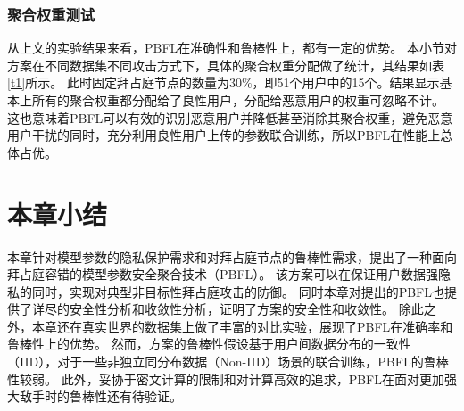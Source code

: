 \subsubsection{聚合权重测试}
从上文的实验结果来看，PBFL在准确性和鲁棒性上，都有一定的优势。
本小节对方案在不同数据集不同攻击方式下，具体的聚合权重分配做了统计，其结果如表\ref{t1}所示。
此时固定拜占庭节点的数量为$30\%$，即51个用户中的15个。结果显示基本上所有的聚合权重都分配给了良性用户，分配给恶意用户的权重可忽略不计。
这也意味着PBFL可以有效的识别恶意用户并降低甚至消除其聚合权重，避免恶意用户干扰的同时，充分利用良性用户上传的参数联合训练，所以PBFL在性能上总体占优。

\begin{table}[htbp]
	\begin{center}
		\caption{PBFL中不同类型节点的聚合权重}
		\label{t1}
		\end{center}
	\end{table}
\section{本章小结}\label{con}
本章针对模型参数的隐私保护需求和对拜占庭节点的鲁棒性需求，提出了一种面向拜占庭容错的模型参数安全聚合技术（PBFL）。
该方案可以在保证用户数据强隐私的同时，实现对典型非目标性拜占庭攻击的防御。
同时本章对提出的PBFL也提供了详尽的安全性分析和收敛性分析，证明了方案的安全性和收敛性。
除此之外，本章还在真实世界的数据集上做了丰富的对比实验，展现了PBFL在准确率和鲁棒性上的优势。
然而，方案的鲁棒性假设基于用户间数据分布的一致性（IID），对于一些非独立同分布数据（Non-IID）场景的联合训练，PBFL的鲁棒性较弱。
此外，妥协于密文计算的限制和对计算高效的追求，PBFL在面对更加强大敌手时的鲁棒性还有待验证。